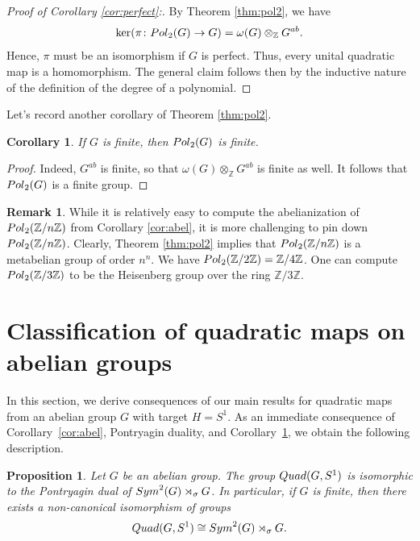 \documentclass[a4paper,11pt]{amsproc}
\theoremstyle{plain}
\newtheorem{proposition}[theorem]{Proposition}
\newtheorem{corollary}[theorem]{Corollary}
\theoremstyle{definition}
\newtheorem{remark}[theorem]{Remark}
\begin{document}
\begin{proof}[Proof of Corollary \ref{cor:perfect}:]
By Theorem \ref{thm:pol2}, we have $$\ker(\pi \colon {\rm Pol}_2(G) \to G)= \omega(G) \otimes_{\mathbb Z} G^{ab}.$$ Hence, $\pi$ must be an isomorphism if $G$ is perfect. Thus, every unital quadratic map is a homomorphism. The general claim follows then by the inductive nature of the definition of the degree of a polynomial.
\end{proof}

Let's record another corollary of Theorem \ref{thm:pol2}.
\begin{corollary} \label{cor:finite}
If $G$ is finite, then ${\rm Pol}_2(G)$ is finite.
\end{corollary}
\begin{proof}
Indeed, $G^{ab}$ is finite, so that $\omega(G) \otimes_{\mathbb Z} G^{ab}$ is finite as well. It follows that ${\rm Pol}_2(G)$ is a finite group.
\end{proof}

\begin{remark}
While it is relatively easy to compute the abelianization of ${\rm Pol}_2(\mathbb Z/n \mathbb Z)$ from Corollary \ref{cor:abel}, it is more challenging to pin down ${\rm Pol}_2(\mathbb Z/n\mathbb Z)$. Clearly, Theorem \ref{thm:pol2} implies that ${\rm Pol}_2(\mathbb Z/n\mathbb Z)$ is a metabelian group of order $n^n$. We have ${\rm Pol}_2(\mathbb Z/2\mathbb Z) = \mathbb Z/4\mathbb Z$. One can compute ${\rm Pol}_2(\mathbb Z/3\mathbb Z)$ to be the Heisenberg group over the ring $\mathbb Z/3\mathbb Z.$
\end{remark}

\section{Classification of quadratic maps on abelian groups}\label{sec:abel}

In this section, we derive consequences of our main results for quadratic maps from an abelian group $G$ with target $H = S^1$. As an immediate consequence of Corollary~\ref{cor:abel}, Pontryagin duality, and Corollary~\ref{cor:finite}, we obtain the following description.


\begin{proposition}\label{prop:abel}
Let $G$ be an abelian group. The group ${\rm Quad}(G,S^1)$ is isomorphic to the Pontryagin dual of ${\rm Sym}^2(G)\rtimes_\sigma G$. In particular, if $G$ is finite, then there exists a non-canonical isomorphism of groups
\[
{\rm Quad}(G,S^1) \cong {\rm Sym}^2(G)\rtimes_\sigma G.
\]
\end{proposition}
\end{document}
